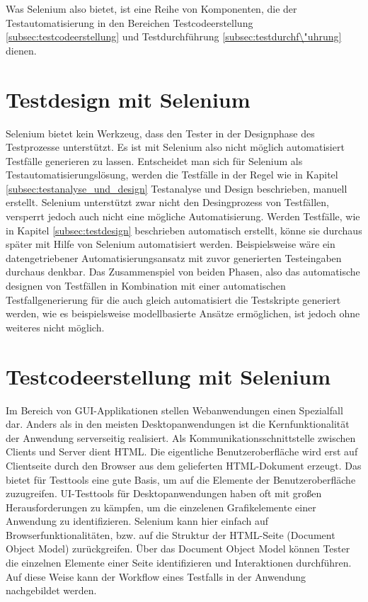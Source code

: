 Was Selenium also bietet, ist eine Reihe von Komponenten, die der Testautomatisierung in den Bereichen Testcodeerstellung \ref{subsec:testcodeerstellung} und Testdurchführung \ref{subsec:testdurchf\"uhrung} dienen.

\section{Testdesign mit Selenium}
\label{sec:Testdesign_mit_selenium}
Selenium bietet kein Werkzeug, dass den Tester in der Designphase des Testprozesse unterstützt.
Es ist mit Selenium also nicht möglich automatisiert Testfälle generieren zu lassen. Entscheidet man sich für Selenium als Testautomatisierungslösung, werden die Testfälle in der Regel wie in Kapitel \ref{subsec:testanalyse_und_design} Testanalyse und Design beschrieben, manuell erstellt. Selenium unterstützt zwar nicht den Desingprozess von Testfällen, versperrt jedoch auch nicht eine mögliche Automatisierung. Werden Testfälle, wie in Kapitel \ref{subsec:testdesign} beschrieben automatisch erstellt, könne sie durchaus später mit Hilfe von Selenium automatisiert werden. Beispielsweise wäre ein datengetriebener Automatisierungsansatz mit zuvor generierten Testeingaben durchaus denkbar. Das Zusammenspiel von beiden Phasen, also das automatische designen von Testfällen in Kombination mit einer automatischen Testfallgenerierung für die auch gleich automatisiert die Testskripte generiert werden, wie es beispielsweise modellbasierte Ansätze ermöglichen, ist jedoch ohne weiteres nicht möglich.

\section{Testcodeerstellung mit Selenium}
\label{sec:Testdesign}

Im Bereich von GUI-Applikationen stellen Webanwendungen einen Spezialfall dar. Anders als in den meisten Desktopanwendungen ist die Kernfunktionalität der Anwendung serverseitig realisiert. Als Kommunikationsschnittstelle zwischen Clients und Server dient HTML. Die eigentliche Benutzeroberfläche wird erst auf Clientseite durch den Browser aus dem gelieferten HTML-Dokument erzeugt. Das bietet für Testtools eine gute Basis, um auf die Elemente der Benutzeroberfläche zuzugreifen. \cite[vgl. Seite 59]{seidl_basiswissen_2012} UI-Testtools für Desktopanwendungen haben oft mit großen Herausforderungen zu kämpfen, um die einzelenen Grafikelemente einer Anwendung zu identifizieren. Selenium kann hier einfach auf Browserfunktionalitäten, bzw. auf die Struktur der HTML-Seite (Document Object Model) zurückgreifen. Über das Document Object Model können Tester die einzelnen Elemente einer Seite identifizieren und Interaktionen durchführen. Auf diese Weise kann der Workflow eines Testfalls in der Anwendung nachgebildet werden.

